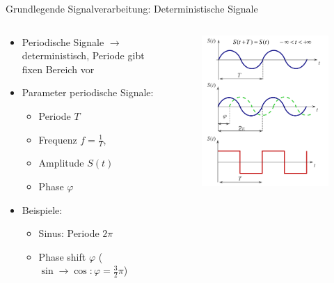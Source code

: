 \documentclass[12pt%
,aspectratio=169%
]{beamer}
\begin{document}
\begin{frame}{Grundlegende Signalverarbeitung: Deterministische Signale}
\begin{columns}[T] %
\begin{column}{.6\textwidth}
\begin{itemize}
	\item Periodische Signale $\to$ deterministisch, Periode gibt fixen Bereich vor
	\item Parameter periodische Signale:
	\begin{itemize}
		\item Periode $T$
		\item Frequenz $f=\frac{1}{T}$, 
		\item Amplitude $S(t)$
		\item Phase $\varphi$
	\end{itemize}
	\item Beispiele:
	\begin{itemize}
		\item Sinus: Periode $2\pi$
		\item Phase shift $\varphi$ ($\sin \to \cos: \varphi= \frac{3}{2} \pi$)
	\end{itemize}
\end{itemize}
\end{column}%
\hfill%
\begin{column}{.4\textwidth}
\vspace*{-.75cm}
\begin{figure}
\includegraphics[scale=0.35]{pictures/sigproc}
\end{figure}
\end{column}%
\end{columns}
\end{frame}
\end{document}
